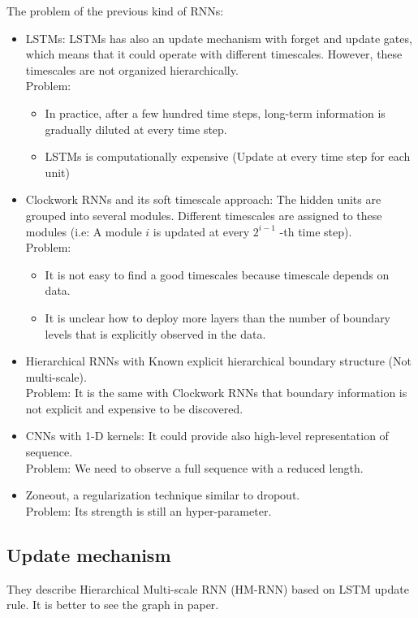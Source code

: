 \documentclass{article}
\begin{document}
The problem of the previous kind of RNNs:
\begin{itemize}
\item LSTMs: LSTMs has also an update mechanism with forget and update gates, which means that it could operate with different timescales. However, these timescales are not organized hierarchically. \\
Problem:
	\begin{itemize}
	 \item In practice, after a few hundred time steps, long-term information is gradually diluted at every time step.
	 \item LSTMs is computationally expensive (Update at every time step for each unit)
 	\end{itemize} 
 	
\item Clockwork RNNs and its soft timescale approach: The hidden units are grouped into several modules. Different timescales are assigned to these modules (i.e: A module $i$ is updated at every $2^{i - 1}$ -th time step).\\
Problem:
	\begin{itemize}
	\item It is not easy to find a good timescales because timescale depends on data.
	\item It is unclear how to deploy more layers than the number of boundary levels that is explicitly observed in the data.
	\end{itemize}
	
\item Hierarchical RNNs with Known explicit hierarchical boundary structure (Not multi-scale).\\ Problem: It is the same with Clockwork RNNs that boundary information is not explicit and expensive to be discovered.

\item CNNs with 1-D kernels: It could provide also high-level representation of sequence.\\
Problem: We need to observe a full sequence with a reduced length.

\item Zoneout, a regularization technique similar to dropout.\\
Problem: Its strength is still an hyper-parameter.

\end{itemize}

\subsection{Update mechanism}
They describe Hierarchical Multi-scale RNN (HM-RNN) based on LSTM update rule. It is better to see the graph in paper.\\
\end{document}

